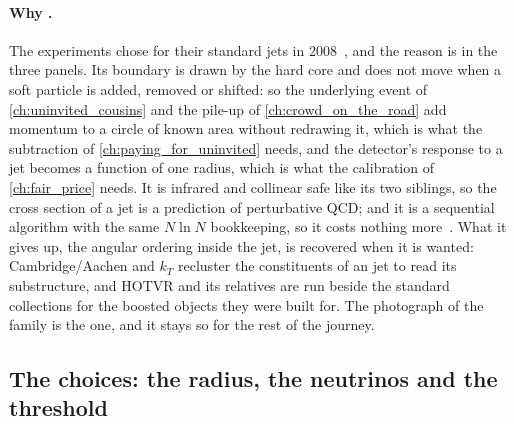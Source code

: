 \paragraph{Why \antikt.} The experiments chose \antikt for their
standard jets in 2008~\cite{Cacciari:2008gp}, and the reason is in the
three panels. Its boundary is drawn by the hard core and does not move
when a soft particle is added, removed or shifted: so the underlying
event of \cref{ch:uninvited_cousins} and the pile-up of
\cref{ch:crowd_on_the_road} add momentum to a circle of known area
without redrawing it, which is what the subtraction of
\cref{ch:paying_for_uninvited} needs, and the detector's response to a
jet becomes a function of one radius, which is what the calibration of
\cref{ch:fair_price} needs. It is infrared and collinear safe like its two
siblings, so the cross section of a jet is a prediction of perturbative
QCD; and it is a sequential algorithm with the same $N\ln N$ bookkeeping,
so it costs nothing more~\cite{Cacciari:2011ma,Salam:2009jx}. What it
gives up, the angular ordering inside the jet, is recovered when it is
wanted: Cambridge/Aachen and $k_T$ recluster the constituents of an
\antikt jet to read its substructure, and HOTVR and its relatives are run
beside the standard collections for the boosted objects they were built
for. The photograph of the family is the \antikt one, and it stays so for
the rest of the journey.

\subsection{The choices: the radius, the neutrinos and the threshold}
\label{sec:family_photograph:choices}

